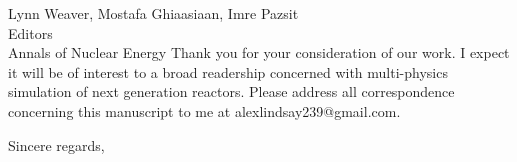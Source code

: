 \documentclass[10pt]{letter} %
\begin{document}
\begin{letter}{Lynn Weaver, Mostafa Ghiaasiaan, Imre Pazsit\\
Editors\\
Annals of Nuclear Energy}
Thank you for your consideration of our work.  I expect it will be of interest
to a broad readership concerned with multi-physics simulation of next generation
reactors.  Please address all correspondence concerning this manuscript to me
at alexlindsay239@gmail.com.

\closing{Sincere regards,}

\end{letter}
\end{document}
